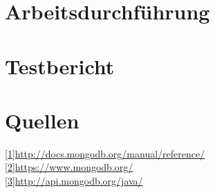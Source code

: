 \documentclass[a4paper,12pt]{scrreprt}
\begin{document}
\chapter{Arbeitsdurchführung}
\chapter{Testbericht}
\chapter{Quellen}
\href{http://docs.mongodb.org/manual/reference/}{[1]http://docs.mongodb.org/manual/reference/}\\
\href{https://www.mongodb.org/}{[2]https://www.mongodb.org/}\\
\href{http://api.mongodb.org/java/}{[3]http://api.mongodb.org/java/}
\end{document}
